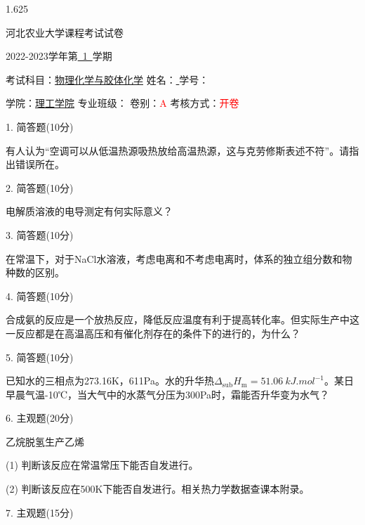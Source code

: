 \documentclass[12pt, b5paper]{article}
\newcommand*{\cred}{\textcolor{red}}
\begin{document}
\begin{spacing}{1.625}

\centerline{{\huge 河北农业大学课程考试试卷}}

\centerline{\large 2022-2023学年第\underline{\ 1\ }学期}

考试科目：\underline{物理化学与胶体化学} \quad 姓名：\underline{ \qquad \qquad} \quad 学号：\underline{ \qquad \qquad \qquad}

学院：\underline{理工学院} \quad 专业班级：\underline{\qquad \qquad \qquad \qquad} \quad 卷别：\cred{A} 考核方式：\cred{开卷}

\bigskip


1. 简答题(10分)

有人认为“空调可以从低温热源吸热放给高温热源，这与克劳修斯表述不符”。请指出错误所在。

\bigskip

\bigskip

2. 简答题(10分)

电解质溶液的电导测定有何实际意义？

\bigskip

\bigskip

3. 简答题(10分)

在常温下，对于NaCl水溶液，考虑电离和不考虑电离时，体系的独立组分数和物种数的区别。

\bigskip

\bigskip

4. 简答题(10分)

合成氨的反应是一个放热反应，降低反应温度有利于提高转化率。但实际生产中这一反应都是在高温高压和有催化剂存在的条件下的进行的，为什么？

\bigskip

\bigskip

5. 简答题(10分)

已知水的三相点为273.16K，611Pa。水的升华热$\Delta_\mathrm{sub}H_\mathrm{m}=\SI{51.06}{kJ.mol^{-1}}$。某日早晨气温-10℃，当大气中的水蒸气分压为300Pa时，霜能否升华变为水气？

\newpage

6. 主观题(20分)

乙烷脱氢生产乙烯 

(1) 判断该反应在常温常压下能否自发进行。

(2) 判断该反应在500K下能否自发进行。相关热力学数据查课本附录。

\bigskip

\bigskip

7. 主观题(15分)


\end{spacing}
\end{document}
